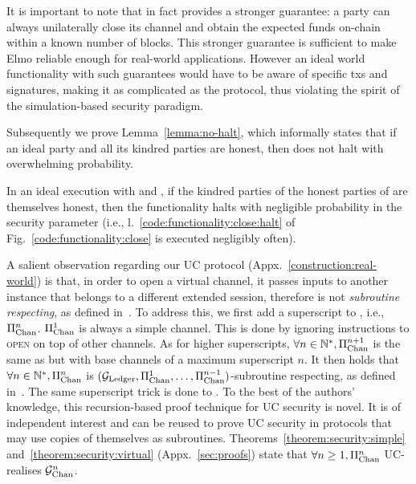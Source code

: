     It is important to note that in fact \pchan provides a stronger guarantee:
  a party can always unilaterally close its channel
  and obtain the expected funds on-chain within a known number of blocks.
  This stronger guarantee is sufficient to make Elmo reliable
  enough for real-world applications. However an ideal world
  functionality with such guarantees would have to be aware of specific
  txs and signatures, making it as complicated
  as the protocol, thus violating the spirit of the simulation-based security
  paradigm.

  Subsequently we prove Lemma~\ref{lemma:no-halt}, which informally states that
  if an ideal party and all its kindred parties are honest, then \fchan does not
  halt with overwhelming probability.

\begin{lemma}[No halt]
\label{lemma:no-halt}
  In an ideal execution with \fchan and \simulator, if the kindred parties of
  the honest parties of \fchan are themselves honest, then the functionality
  halts with negligible probability in the security parameter (i.e.,
  l.~\ref{code:functionality:close:halt} of Fig.~\ref{code:functionality:close}
  is executed negligibly often).
\end{lemma}

  A salient observation
  regarding our UC protocol \pchan (Appx.~\ref{construction:real-world}) is
  that, in order to
  open a virtual channel, it passes inputs to another \pchan instance that
  belongs to a different extended session, therefore \pchan is not
  \emph{subroutine respecting}, as defined in~\cite{uc}. To
  address this, we first add a superscript to \pchan, i.e.,
  $\Pi_{\mathrm{Chan}}^{n}$. $\Pi_{\mathrm{Chan}}^{1}$ is always a simple channel.
  This is done by ignoring instructions to \textsc{open} on top of other
  channels. As for higher superscripts, $\forall n \in
  \mathbb{N}^*, \Pi_{\mathrm{Chan}}^{n+1}$ is the same as \pchan but with
  base channels of a maximum superscript $n$. It then holds that $\forall
  n \in \mathbb{N}^*, \Pi_{\mathrm{Chan}}^{n}$ is $(\mathcal{G}_{\mathrm{Ledger}}, \Pi_{\mathrm{Chan}}^{1}, \dots,
  \Pi_{\mathrm{Chan}}^{n-1})$-subroutine respecting, as defined
  in~\cite{DBLP:conf/tcc/BadertscherCHTZ20}. The same superscript trick is done
  to \fchan. To
  the best of the authors' knowledge, this recursion-based proof technique for
  UC security is novel. It is of independent interest and can be reused to prove
  UC security in protocols that may use copies of themselves as subroutines.
  Theorems~\ref{theorem:security:simple} and~\ref{theorem:security:virtual}
  (Appx.~\ref{sec:proofs}) state
  that $\forall n \geq 1, \Pi_{\mathrm{Chan}}^{n}$ UC-realises $\mathcal{G}_{\mathrm{Chan}}^{n}$.
